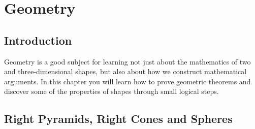 \chapter{Geometry}
\label{m:g11}

\section{Introduction}


%

Geometry is a good subject for learning not just about the mathematics
of two and three-dimensional shapes, but also about how we construct
mathematical arguments. In this chapter you will learn how to prove
geometric theorems and discover some of the properties of shapes
through small logical steps.


\section{Right Pyramids, Right Cones and Spheres}

